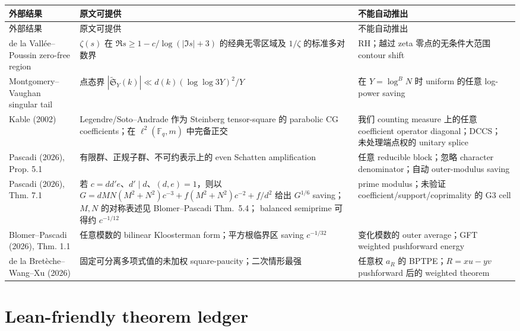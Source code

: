 \documentclass[11pt,a4paper]{ctexart}
\theoremstyle{definition}
\newcommand{\F}{\mathbb F}
\newcommand{\1}{\mathbf 1}
\begin{document}
\begin{center}
\begin{longtable}{p{}p{}p{}}
\toprule
外部结果 & 原文可提供 & 不能自动推出\\
\midrule
\endfirsthead
\toprule
外部结果 & 原文可提供 & 不能自动推出\\
\midrule
\endhead
de la Vall\'ee--Poussin zero-free region
& $\zeta(s)$ 在 $\Re s\ge1-c/\log(|\Im s|+3)$ 的经典无零区域及
$1/\zeta$ 的标准多对数界
& RH；越过 zeta 零点的无条件大范围 contour shift\\
Montgomery--Vaughan singular tail
& 点态界 $|\widetilde{\mathfrak S}_Y(k)|
\ll d(k)(\log\log3Y)^2/Y$
& 在 $Y=\log^B N$ 时 uniform 的任意 log-power saving\\
Kable (2002)
& Legendre/Soto--Andrade 作为 Steinberg tensor-square 的 parabolic CG
coefficients；在 $\ell^2(\F_q,m)$ 中完备正交
& 我们 counting measure 上的任意 coefficient operator diagonal；DCCS；
未处理端点权的 unitary splice\\
Pascadi (2026), Prop. 5.1
& 有限群、正规子群、不可约表示上的 even Schatten amplification
& 任意 reducible block；忽略 character denominator；自动 outer-modulus saving\\
Pascadi (2026), Thm. 7.1
& 若 $c=dd'e$、$d'\mid d$、$(d,e)=1$，则以
$G=dMN(M^2+N^2)c^{-3}+f(M^2+N^2)c^{-2}+f/d^2$
给出 $G^{1/6}$ saving；$M,N$ 的对称表述见 Blomer--Pascadi Thm.~5.4；
balanced semiprime 可得约 $c^{-1/12}$
& prime modulus；未验证 coefficient/support/coprimality 的 G3 cell\\
Blomer--Pascadi (2026), Thm. 1.1
& 任意模数的 bilinear Kloosterman form；平方根临界区 saving $c^{-1/32}$
& 变化模数的 outer average；GFT weighted pushforward energy\\
de la Bret\`eche--Wang--Xu (2026)
& 固定可分离多项式值的未加权 square-paucity；二次情形最强
& 任意权 $a_R$ 的 BPTPE；$R=xu-yv$ pushforward 后的 weighted theorem\\
\bottomrule
\end{longtable}
\end{center}

\section{Lean-friendly theorem ledger}
\end{document}
